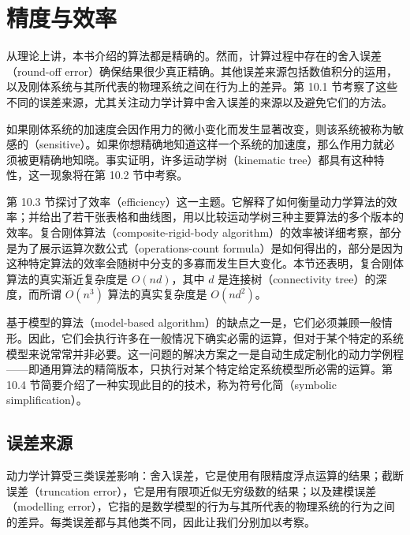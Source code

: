 \documentclass[10pt,a4paper]{book}
\theoremstyle{thmstyle} %
\theoremstyle{defstyle} %
\theoremstyle{prostyle} %
\begin{document}
\chapter{精度与效率}







从理论上讲，本书介绍的算法都是精确的。然而，计算过程中存在的舍入误差（round-off error）确保结果很少真正精确。其他误差来源包括数值积分的运用，以及刚体系统与其所代表的物理系统之间在行为上的差异。第 10.1 节考察了这些不同的误差来源，尤其关注动力学计算中舍入误差的来源以及避免它们的方法。



如果刚体系统的加速度会因作用力的微小变化而发生显著改变，则该系统被称为敏感的（sensitive）。如果你想精确地知道这样一个系统的加速度，那么作用力就必须被更精确地知晓。事实证明，许多运动学树（kinematic tree）都具有这种特性，这一现象将在第 10.2 节中考察。



第 10.3 节探讨了效率（efficiency）这一主题。它解释了如何衡量动力学算法的效率；并给出了若干张表格和曲线图，用以比较运动学树三种主要算法的多个版本的效率。复合刚体算法（composite-rigid-body algorithm）的效率被详细考察，部分是为了展示运算次数公式（operations-count formula）是如何得出的，部分是因为这种特定算法的效率会随树中分支的多寡而发生巨大变化。本节还表明，复合刚体算法的真实渐近复杂度是 $O(nd)$，其中 $d$ 是连接树（connectivity tree）的深度，而所谓 $O(n^3)$ 算法的真实复杂度是 $O(nd^2)$。



基于模型的算法（model-based algorithm）的缺点之一是，它们必须兼顾一般情形。因此，它们会执行许多在一般情况下确实必需的运算，但对于某个特定的系统模型来说常常并非必要。这一问题的解决方案之一是自动生成定制化的动力学例程——即通用算法的精简版本，只执行对某个特定给定系统模型所必需的运算。第 10.4 节简要介绍了一种实现此目的的技术，称为符号化简（symbolic simplification）。



\section{误差来源}





动力学计算受三类误差影响：舍入误差，它是使用有限精度浮点运算的结果；截断误差（truncation error），它是用有限项近似无穷级数的结果；以及建模误差（modelling error），它指的是数学模型的行为与其所代表的物理系统的行为之间的差异。每类误差都与其他类不同，因此让我们分别加以考察。
\end{document}
